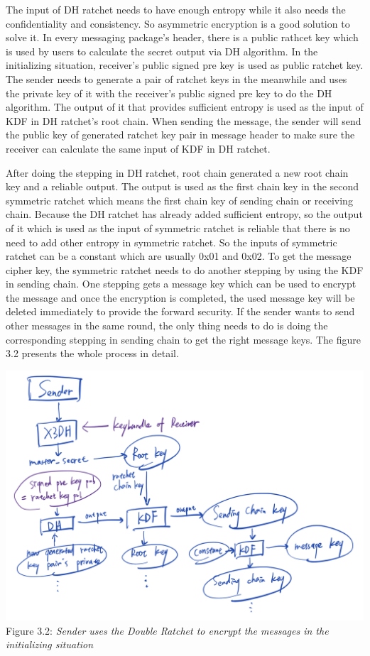 \begin{enumerate}[label=(\roman*)]
The input of DH ratchet needs to have enough entropy while it also needs the confidentiality and consistency. So asymmetric encryption is a good solution to solve it. In every messaging package's header, there is a public rathcet key which is used by users to calculate the secret output via DH algorithm. In the initializing situation, receiver's public signed pre key is used as public ratchet key. The sender needs to generate a pair of ratchet keys in the meanwhile and uses the private key of it with the receiver's public signed pre key to do the DH algorithm. The output of it that provides sufficient entropy is used as the input of KDF in DH ratchet's root chain. When sending the message, the sender will send the public key of generated ratchet key pair in message header to make sure the receiver can calculate the same input of KDF in DH ratchet.

After doing the stepping in DH ratchet, root chain generated a new root chain key and a reliable output. The output is used as the first chain key in the second symmetric ratchet which means the first chain key of sending chain or receiving chain. Because the DH ratchet has already added sufficient entropy, so the output of it which is used as the input of symmetric ratchet is reliable that there is no need to add other entropy in symmetric ratchet. So the inputs of symmetric ratchet can be a constant which are usually 0x01 and 0x02. To get the message cipher key, the symmetric ratchet needs to do another stepping by using the KDF in sending chain. One stepping gets a message key which can be used to encrypt the message and once the encryption is completed, the used message key will be deleted immediately to provide the forward security. If the sender wants to send other messages in the same round, the only thing needs to do is doing the corresponding stepping in sending chain to get the right message keys. The figure 3.2 presents the whole process in detail.

\begin{center}
\includegraphics[scale=.5]{../3-Background/resources/DH-init.png}\\
Figure 3.2: \textit{Sender uses the Double Ratchet to encrypt the messages in the initializing situation}
\end{center}


\end{enumerate}
